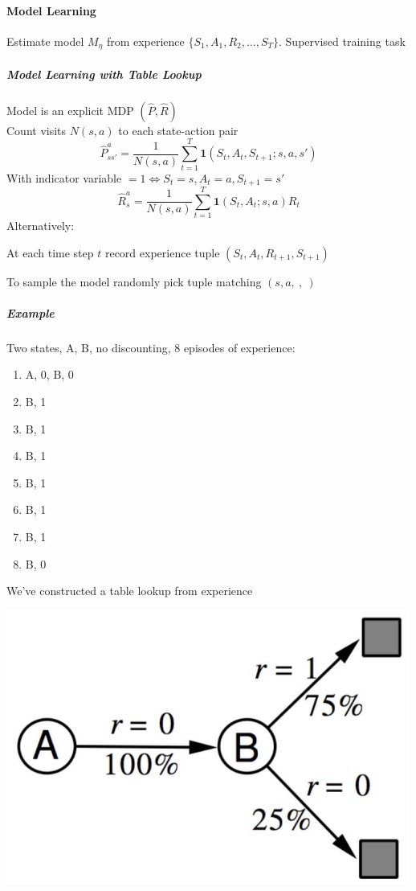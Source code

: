 \documentclass[10pt]{report}
\begin{document}
\paragraph{Model Learning} Estimate model $M_\eta$ from experience $\{S_1,A_1,R_2,\ldots,S_T\}$. Supervised training task %
\subparagraph{Model Learning with Table Lookup} Model is an explicit MDP $(\hat{P},\hat{R})$\\
Count visits $N(s,a)$ to each state-action pair
$$\hat{P}_{ss'}^a=\frac{1}{N(s,a)}\sum_{t=1}^T\mathbf{1}(S_t,A_t,S_{t+1};s,a,s')$$
With indicator variable $=1\Leftrightarrow S_t=s, A_t=a, S_{t+1}=s'$
$$\hat{R}_s^a=\frac{1}{N(s,a)}\sum_{t=1}^T\mathbf{1}(S_t,A_t;s,a)R_t$$
Alternatively:
\begin{list}{}{}
	\item At each time step $t$ record experience tuple $(S_t,A_t,R_{t+1},S_{t+1})$
	\item To sample the model randomly pick tuple matching $(s,a,\:,\:)$
\end{list}
\subparagraph{Example} 
\begin{multicols}{2}
Two states, A, B, no discounting, 8 episodes of experience:
\begin{enumerate}
	\item A, 0, B, 0
	\item B, 1
	\item B, 1
	\item B, 1
	\item B, 1
	\item B, 1
	\item B, 1
	\item B, 0
\end{enumerate}
We've constructed a table lookup from experience
\columnbreak
\begin{center}
	\includegraphics[scale=0.5]{174.png}
\end{center}
\end{multicols}
\end{document}

